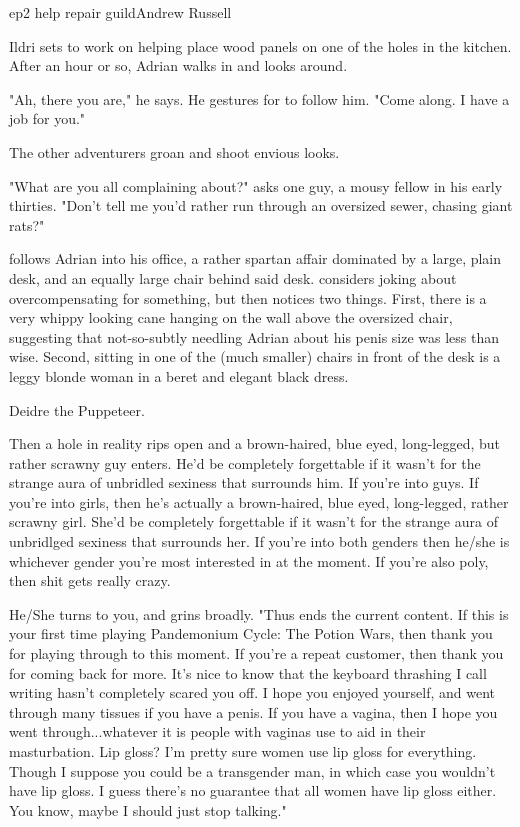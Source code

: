 \documentclass{book}
\begin{document}
\begin{childnode}{ep2 help repair guild}{Andrew Russell}

    Ildri sets \name{} to work on helping place wood panels on one of the holes in the kitchen. After an hour or so, Adrian walks in and looks around.

    "Ah, there you are," he says. He gestures for \name{} to follow him. "Come along. I have a job for you."

    The other adventurers groan and shoot \name{} envious looks.

    "What are you all complaining about?" asks one guy, a mousy fellow in his early thirties. "Don't tell me you'd rather run through an oversized sewer, chasing giant rats?"

    \name{} follows Adrian into his office, a rather spartan affair dominated by a large, plain desk, and an equally large chair behind said desk. \name{} considers joking about 
    overcompensating for something, but then \heshe{} notices two things.
    First, there is a very whippy looking cane hanging on the wall above the oversized chair, suggesting that not-so-subtly needling Adrian about his penis size was less than wise. Second, sitting in one of the (much smaller) chairs in front of the desk is a 
    leggy blonde woman in a beret and elegant black dress.
    
    Deidre the Puppeteer. 

    Then a hole in reality rips open and a brown-haired, blue eyed, long-legged, but rather scrawny guy enters. He'd be completely forgettable if it wasn't for the strange aura of unbridled sexiness that surrounds him. If you're into guys. If you're into girls, then 
    he's 
    actually a brown-haired, blue eyed, long-legged, rather scrawny girl. She'd be completely forgettable if it wasn't for the strange aura of unbridlged sexiness that surrounds her. If you're into both genders then he/she is whichever gender you're most interested 
    in at the moment. If you're also poly, then shit gets really crazy.

    He/She turns to you, and grins broadly. "Thus ends the current content. If this is your first time playing Pandemonium Cycle: The Potion Wars, then thank you for playing through to this moment. If you're a repeat customer, then thank you for coming back for more. 
    It's nice to know that the keyboard thrashing I call writing hasn't completely scared you off. 
    I hope you enjoyed yourself, and went through many tissues if you have a penis. If you have a vagina, then I hope you went through...whatever it is people with vaginas use to aid in their 
    masturbation.
    Lip gloss? I'm pretty sure women use lip gloss for everything. Though I suppose you could be a transgender man,
    in which case you wouldn't have lip gloss. I guess there's no guarantee that all women have lip gloss either. You know, maybe I should just stop talking."
    

\end{childnode}
\end{document}
